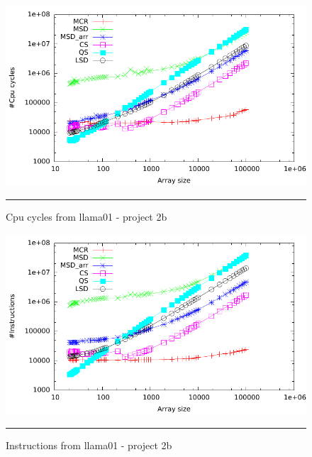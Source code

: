 \begin{figure}[ht]
	\centering
		\includegraphics[width=\textwidth]{./Appendices/Figures/Project2b/Cpu_cycles.pdf}
		\rule{35em}{0.5pt}
	\caption[Cpu cycles]{
	Cpu cycles from llama01 - project 2b
	}
	\label{fig:Cpu_cycles_p2b_putty}
\end{figure}
\begin{figure}[ht]
	\centering
		\includegraphics[width=\textwidth]{./Appendices/Figures/Project2b/Instructions.pdf}
		\rule{35em}{0.5pt}
	\caption[Instructions putty]{
	Instructions from llama01 - project 2b
	}
	\label{fig:Instructions_p2b_putty}
\end{figure}
